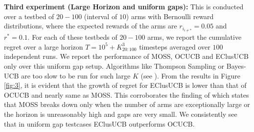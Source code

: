 \textbf{Third experiment (Large Horizon and uniform gaps):} This is conducted over a testbed of $20-100$ (interval of $10$) arms with Bernoulli reward distributions, where the expected rewards of the arms are $r_{i_{{i}\neq {*}}}=0.05$ and $r^{*}=0.1$. For each of these testbeds of $20-100$ arms, we report the cumulative regret over a large horizon $T=10^{5} + K_{20:100}^{3}$ timesteps averaged over $100$ independent runs. We report the performance of MOSS, OCUCB and EClusUCB only over this uniform gap setup. Algorithms like Thompson Sampling or Bayes-UCB are too slow to be run for such large $K$ (see \cite{lattimore2015optimally}). From the results in Figure \ref{fig:3}, it is evident that the growth of regret for EClusUCB is lower than that of OCUCB and nearly same as MOSS. This corroborates the finding of \cite{lattimore2015optimally} which states that MOSS breaks down only when the number of arms are exceptionally large or the horizon is unreasonably high and gaps are very small. We consistently see that in uniform gap testcases EClusUCB outperforms  OCUCB.

